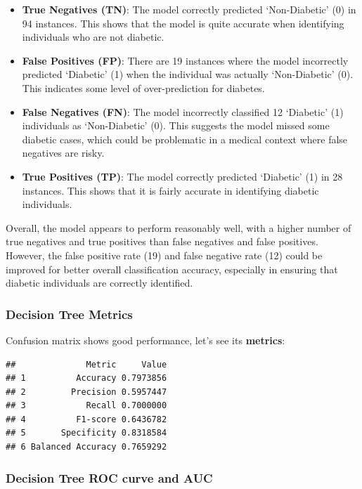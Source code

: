 \documentclass[
]{article}
\providecommand{\tightlist}{%
  \setlength{\itemsep}{0pt}\setlength{\parskip}{0pt}}
\begin{document}
\begin{itemize}
\tightlist
\item
  \textbf{True Negatives (TN)}: The model correctly predicted
  `Non-Diabetic' (0) in 94 instances. This shows that the model is quite
  accurate when identifying individuals who are not diabetic.
\item
  \textbf{False Positives (FP)}: There are 19 instances where the model
  incorrectly predicted `Diabetic' (1) when the individual was actually
  `Non-Diabetic' (0). This indicates some level of over-prediction for
  diabetes.
\item
  \textbf{False Negatives (FN)}: The model incorrectly classified 12
  `Diabetic' (1) individuals as `Non-Diabetic' (0). This suggests the
  model missed some diabetic cases, which could be problematic in a
  medical context where false negatives are risky.
\item
  \textbf{True Positives (TP)}: The model correctly predicted `Diabetic'
  (1) in 28 instances. This shows that it is fairly accurate in
  identifying diabetic individuals.
\end{itemize}

Overall, the model appears to perform reasonably well, with a higher
number of true negatives and true positives than false negatives and
false positives. However, the false positive rate (19) and false
negative rate (12) could be improved for better overall classification
accuracy, especially in ensuring that diabetic individuals are correctly
identified.

\subsubsection{Decision Tree Metrics}\label{decision-tree-metrics}

Confusion matrix shows good performance, let's see its \textbf{metrics}:

\begin{verbatim}
##              Metric     Value
## 1          Accuracy 0.7973856
## 2         Precision 0.5957447
## 3            Recall 0.7000000
## 4          F1-score 0.6436782
## 5       Specificity 0.8318584
## 6 Balanced Accuracy 0.7659292
\end{verbatim}

\newpage

\subsubsection{Decision Tree ROC curve and
AUC}\label{decision-tree-roc-curve-and-auc}
\end{document}
